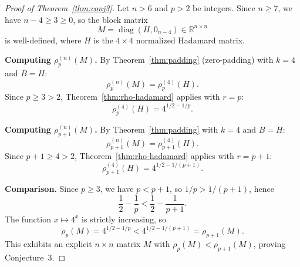 \begin{proof}[Proof of Theorem~\ref{thm:conj3}]
Let $n>6$ and $p>2$ be integers. Since $n\ge7$, we have $n-4\ge3\ge0$, so the block matrix
\[
M=\operatorname{diag}(H,0_{n-4})\in\mathbb{R}^{n\times n}
\]
is well-defined, where $H$ is the $4\times4$ normalized Hadamard matrix.

\textbf{Computing $\rho_p^{(n)}(M)$.}
By Theorem~\ref{thm:padding} (zero-padding) with $k=4$ and $B=H$:
\[
\rho_p^{(n)}(M)=\rho_p^{(4)}(H).
\]
Since $p\ge3>2$, Theorem~\ref{thm:rho-hadamard} applies with $r=p$:
\[
\rho_p^{(4)}(H)=4^{1/2-1/p}.
\]

\textbf{Computing $\rho_{p+1}^{(n)}(M)$.}
By Theorem~\ref{thm:padding} with $k=4$ and $B=H$:
\[
\rho_{p+1}^{(n)}(M)=\rho_{p+1}^{(4)}(H).
\]
Since $p+1\ge4>2$, Theorem~\ref{thm:rho-hadamard} applies with $r=p+1$:
\[
\rho_{p+1}^{(4)}(H)=4^{1/2-1/(p+1)}.
\]

\textbf{Comparison.}
Since $p\ge3$, we have $p<p+1$, so $1/p>1/(p+1)$, hence
\[
\frac{1}{2}-\frac{1}{p}<\frac{1}{2}-\frac{1}{p+1}.
\]
The function $x\mapsto4^x$ is strictly increasing, so
\[
\rho_p(M)=4^{1/2-1/p}<4^{1/2-1/(p+1)}=\rho_{p+1}(M).
\]
This exhibits an explicit $n\times n$ matrix $M$ with $\rho_p(M)<\rho_{p+1}(M)$, proving Conjecture~3.
\end{proof}
